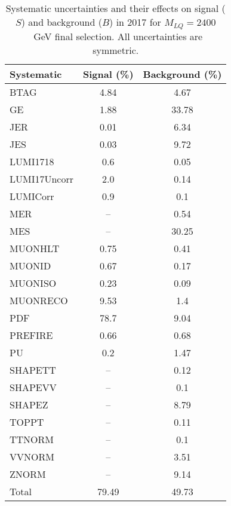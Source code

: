 \begin{table}[htbp]
\begin{center}
\caption{Systematic uncertainties and their effects on signal ($S$) and background ($B$) in 2017 for $M_{LQ}=2400$~GeV final selection. All uncertainties are symmetric.}
\begin{tabular}{lcc}
\hline\hline
Systematic & Signal (\%) & Background (\%) \\ \hline 
BTAG & 4.84 & 4.67\\ 
GE & 1.88 & 33.78\\ 
JER & 0.01 & 6.34\\ 
JES & 0.03 & 9.72\\ 
LUMI1718 & 0.6 & 0.05\\ 
LUMI17Uncorr & 2.0 & 0.14\\ 
LUMICorr & 0.9 & 0.1\\ 
MER & -- & 0.54\\ 
MES & -- & 30.25\\ 
MUONHLT & 0.75 & 0.41\\ 
MUONID & 0.67 & 0.17\\ 
MUONISO & 0.23 & 0.09\\ 
MUONRECO & 9.53 & 1.4\\ 
PDF & 78.7 & 9.04\\ 
PREFIRE & 0.66 & 0.68\\ 
PU & 0.2 & 1.47\\ 
SHAPETT & -- & 0.12\\ 
SHAPEVV & -- & 0.1\\ 
SHAPEZ & -- & 8.79\\ 
TOPPT & -- & 0.11\\ 
TTNORM & -- & 0.1\\ 
VVNORM & -- & 3.51\\ 
ZNORM & -- & 9.14\\ 
Total & 79.49 & 49.73\\ \hline \hline
\end{tabular}
\label{tab:SysUncertainties_uujj_2400}
\end{center}
\end{table}

